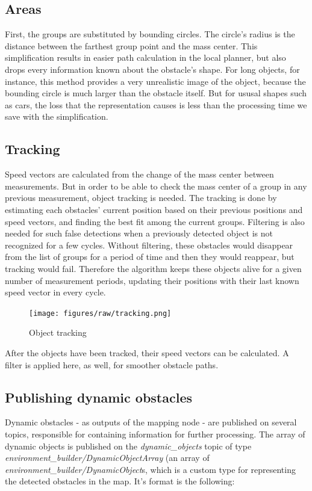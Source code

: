 \subsection{Areas}
First, the groups are substituted by bounding circles. The circle's radius is the distance between the farthest group point and the mass center. This simplification results in easier path calculation in the local planner, but also drops every information known about the obstacle's shape. For long objects, for instance, this method provides a very unrealistic image of the object, because the bounding circle is much larger than the obstacle itself. But for ususal shapes such as cars, the loss that the representation causes is less than the processing time we save with the simplification.

\subsection{Tracking}
\label{chap:tracking}
Speed vectors are calculated from the change of the mass center between measurements. But in order to be able to check the mass center of a group in any previous measurement, object tracking is needed. The tracking is done by estimating each obstacles' current position based on their previous positions and speed vectors, and finding the best fit among the current groups. Filtering is also needed for such false detections when a previously detected object is not recognized for a few cycles. Without filtering, these obstacles would disappear from the list of groups for a period of time and then they would reappear, but tracking would fail. Therefore the algorithm keeps these objects alive for a given number of measurement periods, updating their positions with their last known speed vector in every cycle.

\begin{figure}[!ht]
    \centering
    \texttt{[image: figures/raw/tracking.png]}
    \caption{Object tracking}
    \label{tracking}
\end{figure}

After the objects have been tracked, their speed vectors can be calculated. A filter is applied here, as well, for smoother obstacle paths.

\subsection{Publishing dynamic obstacles}
\label{chap:publishing_dynamic_obstacles}
Dynamic obstacles - as outputs of the mapping node - are published on several topics, responsible for containing information for further processing. The array of dynamic objects is published on the \textit{dynamic\_objects} topic of type \textit{environment\_builder/DynamicObjectArray} (an array of \textit{environment\_builder/DynamicObject}s, which is a custom type for representing the detected obstacles in the map. It's format is the following:

